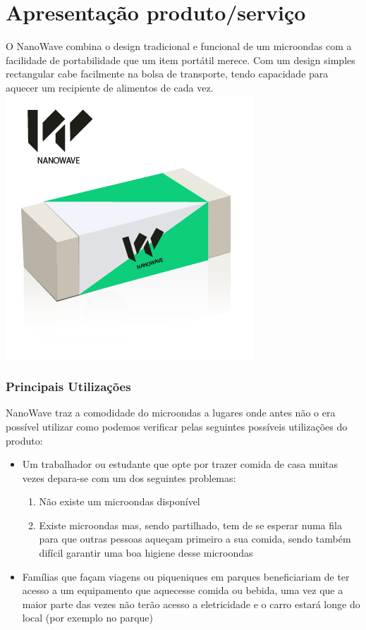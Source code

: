 \documentclass[a4paper]{article}
\begin{document}
\part{Apresentação produto/serviço}
O NanoWave combina o design tradicional e funcional de um microondas com a facilidade de portabilidade que um item portátil merece. Com um design simples rectangular cabe facilmente na bolsa de transporte, tendo capacidade para aquecer um recipiente de alimentos de cada vez.\\
\includegraphics[scale=0.5]{package.png}

\section{Principais Utilizações}
NanoWave traz a comodidade do microondas a lugares onde antes não o era possível utilizar como podemos verificar pelas seguintes possíveis utilizações do produto:
\begin{itemize}
    \item Um trabalhador ou estudante que opte por trazer comida de casa muitas vezes depara-se com um dos seguintes problemas:
    \begin{enumerate}
        \item Não existe um microondas disponível
        \item Existe microondas mas, sendo partilhado, tem de se esperar numa fila para que outras pessoas aqueçam primeiro a sua comida, sendo também difícil garantir uma boa higiene desse microondas
    \end{enumerate}
    \item Famílias que façam viagens ou piqueniques em parques beneficiariam de ter acesso a um equipamento que aquecesse comida ou bebida, uma vez que a maior parte das vezes não terão acesso a eletricidade e o carro estará longe do local (por exemplo no parque)
\end{itemize}
\end{document}
